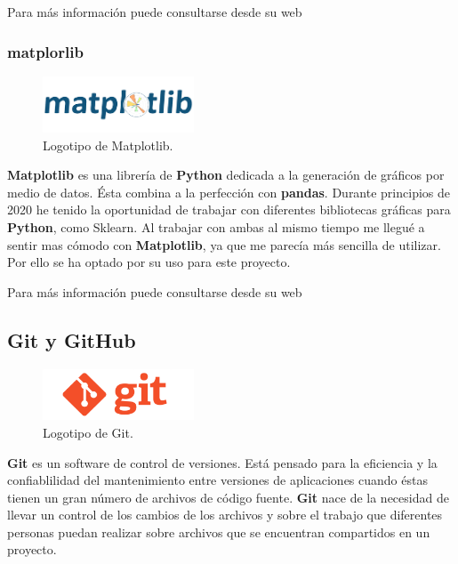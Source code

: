 Para más información puede consultarse desde su web \cite{pandas}

\subsubsection{matplorlib}

\begin{figure}[H]
	\centering
	\includegraphics[width=0.4\textwidth]{img/matplotlib-icon}
	\caption{Logotipo de Matplotlib.}
\end{figure}

\textbf{Matplotlib} es una librería de \textbf{Python} dedicada a la generación de gráficos por medio de datos. Ésta combina a la perfección con \textbf{pandas}. Durante principios de 2020 he tenido la oportunidad de trabajar con diferentes bibliotecas gráficas para \textbf{Python}, como Sklearn. Al trabajar con ambas al mismo tiempo me llegué a sentir mas cómodo con \textbf{Matplotlib}, ya que me parecía más sencilla de utilizar. Por ello se ha optado por su uso para este proyecto.

Para más información puede consultarse desde su web \cite{matplotlib}

\subsection{Git y GitHub}

\begin{figure}[H]
	\centering
	\includegraphics[width=0.4\textwidth]{img/git-icon}
	\caption{Logotipo de Git.}
\end{figure}

\textbf{Git} es un software de control de versiones. Está pensado para la eficiencia y la confiablilidad del mantenimiento entre versiones de aplicaciones cuando éstas tienen un gran número de archivos de código fuente. \textbf{Git} nace de la necesidad de llevar un control de los cambios de los archivos y sobre el trabajo que diferentes personas puedan realizar sobre archivos que se encuentran compartidos en un proyecto.

